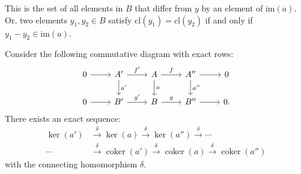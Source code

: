 This is the set of all elements in \( B \) that differ from \( y \) by an element of \( \text{im}(a) \). Or, two elements \( y_1, y_2 \in B \) satisfy \( \text{cl}(y_1) = \text{cl}(y_2) \) if and only if \( y_1 - y_2 \in \text{im}(a) \).

\begin{lemma}{\cite[Snake Lemma 1.3.2]{Weibel1994}}
	\label{snake}
	Consider the following commutative diagram with exact rows:
	\begin{equation}
		\begin{tikzcd}
			0 \arrow[r] & A' \arrow[r, "f'"] \arrow[d, "a'"] & A \arrow[r, "f"] \arrow[d, "a"] & A'' \arrow[r] \arrow[d, "a''"] & 0 \\
			0 \arrow[r] & B' \arrow[r, "g'"] & B \arrow[r, "g"] & B'' \arrow[r] & 0.
		\end{tikzcd}
	\end{equation}
	There exists an exact sequence:
	\begin{align}
		 \ker(a') &\xrightarrow{\delta} \ker(a) \xrightarrow{\delta} \ker(a'') \xrightarrow{\delta} \cdots \nonumber\\
		 \cdots &\xrightarrow{\delta} \operatorname{coker}(a') \xrightarrow{\delta} \operatorname{coker}(a) \xrightarrow{\delta} \operatorname{coker}(a'') 
	\end{align}
	with the connecting homomorphism \(\delta\).
\end{lemma}

